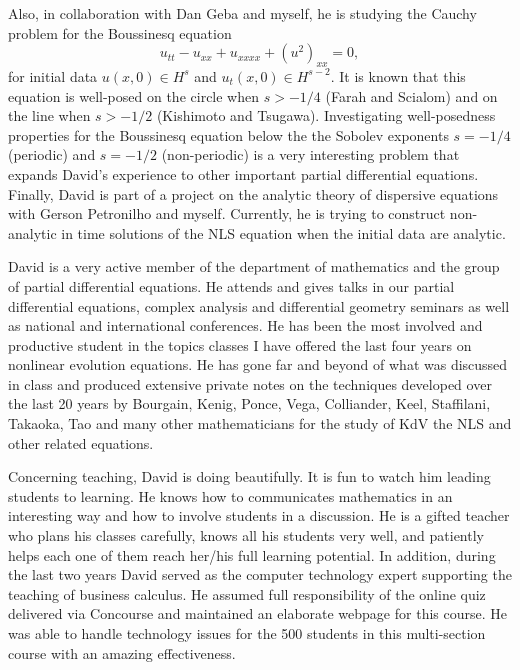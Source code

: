 %

Also, in collaboration with Dan Geba and myself,
he is studying the Cauchy  problem for 
 the Boussinesq equation
\begin{equation}
\label{buss}
   u_{tt} - u_{xx} + u_{xxxx} + (u^{2})_{xx} = 0,
   \end{equation}
  for initial data $u(x,0) \in H^{s}$ and  $u_{t}(x,0)\in H^{s-2}$.
  It is known that this equation is well-posed on the circle
when $s>-1/4$ (Farah and Scialom) and on the line 
when  $s>-1/2$  (Kishimoto and Tsugawa).
Investigating  well-posedness properties for
the Boussinesq equation below the  
the Sobolev exponents 
$s=-1/4$ (periodic) and  $s=-1/2$ (non-periodic) 
is a very interesting problem
that expands David's experience 
to other important partial differential equations. 
Finally,  David is part of a project on the  analytic theory
of dispersive equations with  Gerson Petronilho and myself.
Currently, he is trying to construct non-analytic in time solutions of the 
NLS equation when the initial data are analytic. 


David is a very active member of the department of mathematics
 and the  group of partial differential equations.
 He attends and gives talks in our partial differential equations, 
complex analysis and differential  geometry seminars as well as 
national and international conferences.
He has been the most involved and productive student 
in the topics classes I have offered the last four years
on nonlinear evolution equations.
He has gone far and beyond of what was discussed 
in class and produced extensive private notes 
on the techniques  developed over the last 20 years by Bourgain, 
 Kenig, Ponce, Vega, Colliander, Keel, Staffilani, Takaoka, Tao and many other mathematicians for the study of KdV the NLS and other related equations.



 

Concerning teaching,  David  is doing beautifully.
It is fun to watch him  leading students to learning.
He knows how to communicates mathematics in an interesting
 way and how to involve students in a discussion. 
He is a gifted teacher who plans his classes carefully,
knows all his students very well,  and patiently helps
each one of them reach her/his full learning potential.
In addition,  during  the last two years David served
as the  computer technology expert supporting
the teaching of business calculus.
He assumed full  responsibility of the online quiz 
delivered via Concourse and maintained 
an elaborate webpage for this course.
He was able to handle technology  issues for 
the  500 students in this multi-section course 
with an amazing effectiveness. 




